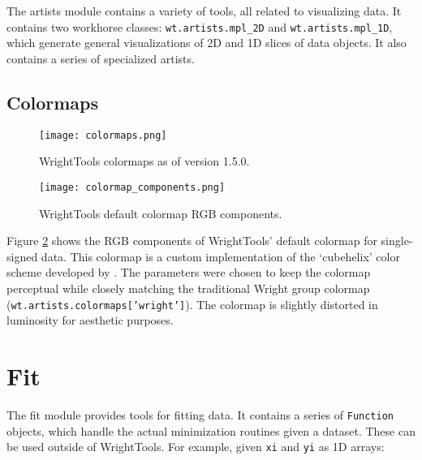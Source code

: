 \documentclass[11pt]{article}
\begin{document}
The artists module contains a variety of tools, all related to visualizing data. It contains two workhorse classes: \texttt{wt.artists.mpl\_2D} and \texttt{wt.artists.mpl\_1D}, which generate general visualizations of 2D and 1D slices of data objects. It also contains a series of specialized artists.

\subsection{Colormaps}

\begin{figure} \label{fig:colormaps}
	\begin{centering}
		\texttt{[image: colormaps.png]}
		\caption{WrightTools colormaps as of version 1.5.0.}
	\end{centering}
\end{figure}

\begin{figure} \label{fig:colormap components}
	\begin{centering}
		\texttt{[image: colormap\_components.png]}
		\caption{WrightTools default colormap RGB components.}
	\end{centering}
\end{figure}

Figure \ref{fig:colormap components} shows the RGB components of WrightTools' default colormap for single-signed data. This colormap is a custom implementation of the `cubehelix' color scheme developed by \textcite{Green2011}. The parameters were chosen to keep the colormap perceptual while closely matching the traditional Wright group colormap (\texttt{wt.artists.colormaps['wright']}). The colormap is slightly distorted in luminosity for aesthetic purposes.

\pagebreak
\section{Fit} 
	
	The fit module provides tools for fitting data. It contains a series of \texttt{Function} objects, which handle the actual minimization routines given a dataset. These can be used outside of WrightTools. For example, given \texttt{xi} and \texttt{yi} as 1D arrays:
	
	
\end{document}
